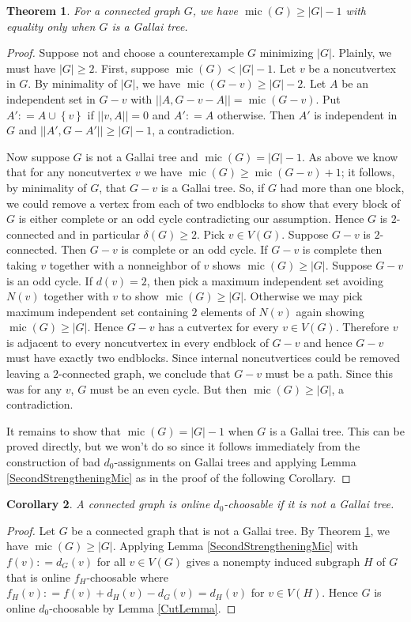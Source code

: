 \documentclass[12pt]{article}
\theoremstyle{plain}
\newtheorem{thm}{Theorem}[section]
\newtheorem{cor}[thm]{Corollary}
\theoremstyle{definition}
\theoremstyle{remark}
\newcommand{\set}[1]{\left\{ #1 \right\}}
\newcommand{\DefinedAs}{\mathrel{\mathop:}=}
\newcommand{\mic}{\operatorname{mic}}
\begin{document}
\begin{thm}\label{micBasics}
For a connected graph $G$, we have $\mic(G) \ge |G| - 1$ with equality only when $G$ is a Gallai tree.
\end{thm}
\begin{proof}
Suppose not and choose a counterexample $G$ minimizing $|G|$.  Plainly, we must have $|G| \ge 2$. First, suppose $\mic(G) < |G| - 1$.  Let $v$ be a noncutvertex in $G$.  By minimality of $|G|$, we have $\mic(G-v) \ge |G|-2$.  Let $A$ be an independent set in $G-v$ with $||A, G-v-A|| = \mic(G-v)$.  Put $A' \DefinedAs A \cup \set{v}$ if $||v, A|| = 0$ and $A' \DefinedAs A$ otherwise.  Then $A'$ is independent in $G$ and $||A', G-A'|| \ge |G|-1$, a contradiction.

Now suppose $G$ is not a Gallai tree and $\mic(G) = |G| - 1$.  As above we know that for any noncutvertex $v$ we have $\mic(G) \ge \mic(G-v) + 1$; it follows, by minimality of $G$, that $G-v$ is a Gallai tree.  So,
if $G$ had more than one block, we could remove a vertex from each of two endblocks to show that every block of $G$ is either complete or an odd cycle contradicting our assumption.  Hence $G$ is $2$-connected and in particular $\delta(G) \ge 2$.  Pick $v \in V(G)$.  Suppose $G-v$ is $2$-connected.  Then $G-v$ is complete or an odd cycle.  If $G-v$ is complete then taking $v$ together with a nonneighbor of $v$ shows $\mic(G) \ge |G|$.  Suppose $G-v$ is an odd cycle.  If $d(v) = 2$, then pick a maximum independent set avoiding $N(v)$ together with $v$ to show $\mic(G) \ge |G|$.  Otherwise we may pick maximum independent set containing $2$ elements of $N(v)$ again showing $\mic(G) \ge |G|$.  Hence $G-v$ has a cutvertex for every $v \in V(G)$.  Therefore $v$ is adjacent to every noncutvertex in every endblock of $G-v$ and hence $G-v$ must have exactly two endblocks.  Since internal noncutvertices could be removed leaving a $2$-connected graph, we conclude that $G-v$ must be a path.  Since this was for any $v$, $G$ must be an even cycle.  But then $\mic(G) \ge |G|$, a contradiction.

It remains to show that $\mic(G) = |G| - 1$ when $G$ is a Gallai tree.  This can be proved directly, but we won't do so since it follows immediately from the construction of bad $d_0$-assignments on Gallai trees and applying Lemma \ref{SecondStrengtheningMic} as in the proof of the following Corollary.
\end{proof}

\begin{cor}
A connected graph is online $d_0$-choosable if it is not a Gallai tree.
\end{cor}
\begin{proof}
Let $G$ be a connected graph that is not a Gallai tree. By Theorem \ref{micBasics}, we have $\mic(G) \ge |G|$.  Applying Lemma \ref{SecondStrengtheningMic} with $f(v) \DefinedAs d_G(v)$ for all $v \in V(G)$ gives
a nonempty induced subgraph $H$ of $G$ that is online $f_H$-choosable where $f_H(v) \DefinedAs f(v) + d_H(v) - d_G(v) = d_H(v)$ for $v \in V(H)$.  Hence $G$ is online $d_0$-choosable by Lemma \ref{CutLemma}.
\end{proof}
\end{document}
